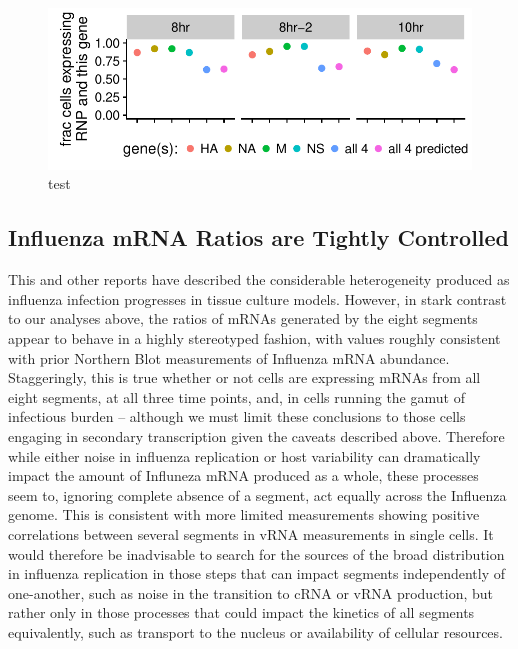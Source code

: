 \documentclass[9pt,lineno]{elife}
\begin{document}
\begin{figure}
\includegraphics[width=\linewidth]{figures/p_missing_genes.pdf}
\caption{\label{fig:missingseg}
test
}
\end{figure}


	
\subsection{Influenza mRNA Ratios are Tightly Controlled}
	
	This and other reports have described the considerable heterogeneity produced as influenza infection progresses in tissue culture models. However, in stark contrast to our analyses above, the ratios of mRNAs generated by the eight segments appear to behave in a highly stereotyped fashion, with values roughly consistent with prior Northern Blot measurements of Influenza mRNA abundance. Staggeringly, this is true whether or not cells are expressing mRNAs from all eight segments, at all three time points,  and, in cells running the gamut of infectious burden -- although we must limit these conclusions to those cells engaging in secondary transcription given the caveats described above. Therefore while either noise in influenza replication or host variability can dramatically impact the amount of Influneza mRNA produced as a whole, these processes seem to, ignoring complete absence of a segment, act equally across the Influenza genome. This is consistent with more limited measurements showing positive correlations between several segments in vRNA measurements in single cells. It would therefore be inadvisable to search for the sources of the broad distribution in influenza replication in those steps that can impact segments independently of one-another, such as noise in the transition to cRNA or vRNA production, but rather only in those processes that could impact the kinetics of all segments equivalently, such as transport to the nucleus or availability of cellular resources. 
\end{document}
